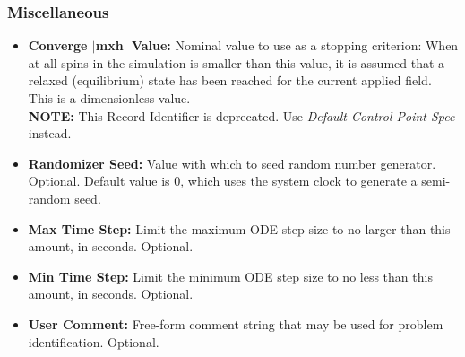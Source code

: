 \subsubsection{Miscellaneous}\label{sec:mifmisc}
\begin{itemize}
   \item {\bf\boldmath Converge $|$mxh$|$ Value:}
      Nominal value to use as a stopping criterion: When
      {}
      {}
      at all spins in the simulation is smaller than this value, it is
      assumed that a relaxed (equilibrium) state has been reached for
      the current applied field.  This is a dimensionless value.\\
      {\bf NOTE:} This Record Identifier is deprecated.  Use {\em
      Default Control Point Spec} instead.
  \item {\bf Randomizer Seed:} Value with which to seed random
      number generator.  Optional.  Default value
      is 0, which uses the system clock to generate a semi-random seed.
  \item {\bf Max Time Step:} Limit the maximum ODE step
      size to no larger than this amount, in
      seconds.  Optional.
  \item {\bf Min Time Step:} Limit the minimum ODE step size to no
      less than this amount, in seconds.  Optional.
  \item {\bf User Comment:} Free-form comment string that may be used
      for problem identification.  Optional.
\end{itemize}

